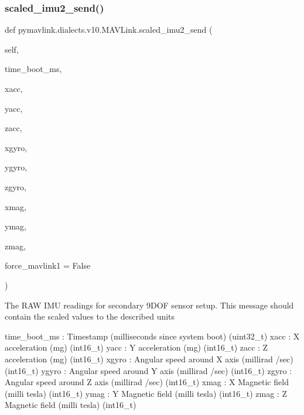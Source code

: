 \begin{DoxyVerb}
\begin{DoxyVerb}
\begin{DoxyVerb}
\begin{DoxyVerb}
\begin{DoxyVerb}
\begin{DoxyVerb}
\begin{DoxyVerb}
\begin{DoxyVerb}
\begin{DoxyVerb}
\begin{DoxyVerb}
\subsubsection{\texorpdfstring{scaled\+\_\+imu2\+\_\+send()}{scaled\_imu2\_send()}}
{\footnotesize\ttfamily def pymavlink.\+dialects.\+v10.\+M\+A\+V\+Link.\+scaled\+\_\+imu2\+\_\+send (\begin{DoxyParamCaption}\item[{}]{self,  }\item[{}]{time\+\_\+boot\+\_\+ms,  }\item[{}]{xacc,  }\item[{}]{yacc,  }\item[{}]{zacc,  }\item[{}]{xgyro,  }\item[{}]{ygyro,  }\item[{}]{zgyro,  }\item[{}]{xmag,  }\item[{}]{ymag,  }\item[{}]{zmag,  }\item[{}]{force\+\_\+mavlink1 = {\ttfamily False} }\end{DoxyParamCaption})}

\begin{DoxyVerb}The RAW IMU readings for secondary 9DOF sensor setup. This message
should contain the scaled values to the described
units

time_boot_ms              : Timestamp (milliseconds since system boot) (uint32_t)
xacc                      : X acceleration (mg) (int16_t)
yacc                      : Y acceleration (mg) (int16_t)
zacc                      : Z acceleration (mg) (int16_t)
xgyro                     : Angular speed around X axis (millirad /sec) (int16_t)
ygyro                     : Angular speed around Y axis (millirad /sec) (int16_t)
zgyro                     : Angular speed around Z axis (millirad /sec) (int16_t)
xmag                      : X Magnetic field (milli tesla) (int16_t)
ymag                      : Y Magnetic field (milli tesla) (int16_t)
zmag                      : Z Magnetic field (milli tesla) (int16_t)\end{DoxyVerb}
 \mbox{\label{classpymavlink_1_1dialects_1_1v10_1_1MAVLink_aaeb40bdd6fcabcb90719d9f07e6bb522}} 

\end{DoxyVerb}
\end{DoxyVerb}
\end{DoxyVerb}
\end{DoxyVerb}
\end{DoxyVerb}
\end{DoxyVerb}
\end{DoxyVerb}
\end{DoxyVerb}
\end{DoxyVerb}
\end{DoxyVerb}
